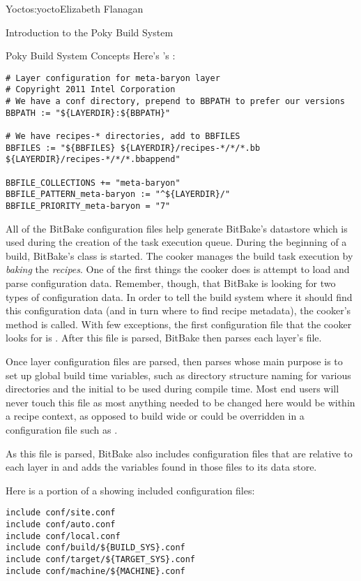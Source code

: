 \begin{aosachapter}{Yocto}{s:yocto}{Elizabeth Flanagan}
\begin{aosasect1}{Introduction to the Poky Build System}
\begin{aosasect2}{Poky Build System Concepts}
Here's 's :

\begin{verbatim}
# Layer configuration for meta-baryon layer
# Copyright 2011 Intel Corporation
# We have a conf directory, prepend to BBPATH to prefer our versions
BBPATH := "${LAYERDIR}:${BBPATH}"

# We have recipes-* directories, add to BBFILES
BBFILES := "${BBFILES} ${LAYERDIR}/recipes-*/*/*.bb ${LAYERDIR}/recipes-*/*/*.bbappend"

BBFILE_COLLECTIONS += "meta-baryon"
BBFILE_PATTERN_meta-baryon := "^${LAYERDIR}/"
BBFILE_PRIORITY_meta-baryon = "7"
\end{verbatim}

All of the BitBake configuration files help generate BitBake's
datastore which is used during the creation of the task execution
queue. During the beginning of a build, BitBake's  class is
started. The cooker manages the build task execution by \emph{baking} the
\emph{recipes}. One of the first things the cooker does is attempt to load
and parse configuration data. Remember, though, that BitBake is
looking for two types of configuration data. In order to tell the
build system where it should find this configuration data (and in turn
where to find recipe metadata), the cooker's 
method is called.  With few exceptions, the first configuration file
that the cooker looks for is . After this file is parsed,
BitBake then parses each layer's  file. 

Once layer configuration files are parsed, 
then parses  whose main purpose is to set up global build
time variables, such as directory structure naming for various 
directories and the initial  to be used during compile time.
Most end users will never touch this file as most anything needed to
be changed here would be within a recipe context, as opposed to build
wide or could be overridden in a configuration file such as .

As this file is parsed, BitBake also includes
configuration files that are relative to each layer in  and
adds the variables found in those files to its data store.

Here is a portion of a  showing included configuration files:

\begin{verbatim}
include conf/site.conf
include conf/auto.conf
include conf/local.conf
include conf/build/${BUILD_SYS}.conf
include conf/target/${TARGET_SYS}.conf
include conf/machine/${MACHINE}.conf
\end{verbatim}


\end{aosasect2}
\end{aosasect1}
\end{aosachapter}
